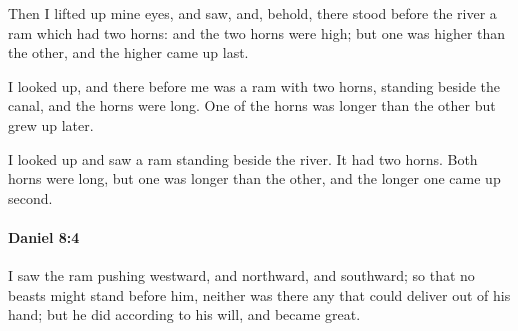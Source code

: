 			\begin{versebox}
					\item[BHS] 
					\item[LXX] 
					\item[ASV] Then I lifted up mine eyes, and saw, and, behold, there stood before the river a ram which had two horns: and the two horns were high; but one was higher than the other, and the higher came up last.
					\item[NIV] I looked up, and there before me was a ram with two horns, standing beside the canal, and the horns were long. One of the horns was longer than the other but grew up later.
					\item[NRSV] I looked up and saw a ram standing beside the river. It had two horns. Both horns were long, but one was longer than the other, and the longer one came up second.
			\end{versebox}

		\paragraph{Daniel 8:4} %
			\label{DANIEL-8-4}

			I saw the ram pushing westward, and northward, and southward; so that no beasts might stand before him, neither was there any that could deliver out of his hand; but he did according to his will, and became great.

